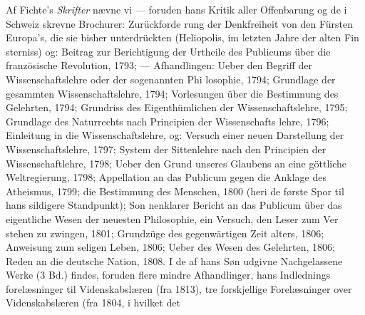\documentclass[12pt,a4paper]{book}
\begin{document}
Af Fichte's \emph{Skrifter} nævne vi --- foruden hans Kritik aller
Offenbarung og de i Schweiz skrevne Brochurer: Zurückforde\-%
rung der Denkfreiheit von den Fürsten Europa's, die sie bisher
unterdrückten (Heliopolis, im letzten Jahre der alten Fin\-%
sterniss) og: Beitrag zur Berichtigung der Urtheile des Publicums
über die französische Revolution, 1793; --- Afhandlingen: Ueber
den Begriff der Wissenschaftslehre oder der sogenannten Phi\-%
losophie, 1794; Grundlage der gesammten Wissenschaftslehre,
1794; Vorlesungen über die Bestimmung des Gelehrten, 1794;
Grundriss des Eigenthümlichen der Wissenschaftslehre, 1795;
Grundlage des Naturrechts nach Principien der Wissenschafts\-%
lehre, 1796; Einleitung in die Wissenschaftslehre, og: Versuch
einer neuen Darstellung der Wissenschaftslehre, 1797; System
der Sittenlehre nach den Principien der Wissenschaftlehre,
1798; Ueber den Grund unseres Glaubens an eine göttliche
Weltregierung, 1798; Appellation an das Publicum gegen die
Anklage des Atheismus, 1799; die Bestimmung des Menschen,
1800 (heri de første Spor til hans sildigere Standpunkt); Son\-%
nenklarer Bericht an das Publicum über das eigentliche Wesen
der neuesten Philosophie, ein Versuch, den Leser zum Ver\-%
stehen zu zwingen, 1801; Grundzüge des gegenwärtigen Zeit\-%
alters, 1806; Anweisung zum seligen Leben, 1806; Ueber des
Wesen des Gelehrten, 1806; Reden an die deutsche Nation,
1808. I de af hans Søn udgivne Nachgelassene Werke (3 Bd.)
findes, foruden flere mindre Afhandlinger, hans Indlednings\-%
forelæsninger til Videnskabslæren (fra 1813), tre forskjellige
Forelæsninger over Videnskabslæren (fra 1804, i hvilket det
\end{document}
